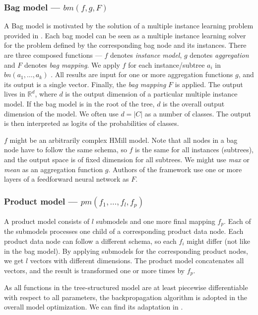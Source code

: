 \subsubsection{Bag model --- $bm(f,g,F)$}
A Bag model is motivated by the solution of a multiple instance learning problem provided in \cite{Pevny2016a}. Each bag model can be seen as a multiple instance learning solver for the problem defined by the corresponding bag node and its instances. There are three composed functions --- $f$ denotes \emph{instance model}, $g$ denotes \emph{aggregation} and $F$ denotes \emph{bag mapping}. We apply $f$ for each instance/subtree $a_i$ in $bn(a_1,\dots,a_k)$ . All results are input for one or more aggregation functions $g$, and its output is a single vector. Finally, the \emph{bag mapping} $F$ is applied. The output lives in  $\mathbb{R}^d$, where $d$ is the output dimension of a particular multiple instance model. If the bag model is in the root of the tree, $d$ is the overall output dimension of the model. We often use $d=|C|$ as a number of classes. The output is then interpreted as logits of the probabilities of classes.

$f$ might be an arbitrarily complex HMill model. Note that all nodes in a bag node have to follow the same schema, so $f$ is the same for all instances (subtrees), and the output space is of fixed dimension for all subtrees. We might use \emph{max} or \emph{mean} as an aggregation function $g$. Authors of the framework use one or more layers of a feedforward neural network as $F$.

\subsubsection{Product model --- $pm(f_1,\dots,f_l,f_p)$}
A product model consists of $l$ submodels and one more final mapping $f_p$. Each of the submodels processes one child of a corresponding product data node. Each product data node can follow a different schema, so each $f_i$ might differ (not like in the bag model). By applying submodels for the corresponding product nodes, we get $l$ vectors with different dimensions. The product model concatenates all vectors, and the result is transformed one or more times by $f_p$.

As all functions in the tree-structured model are at least piecewise differentiable with respect to all parameters, the backpropagation algorithm is adopted in the overall model optimization. We can find its adaptation in \cite{Mandlik2020}.

